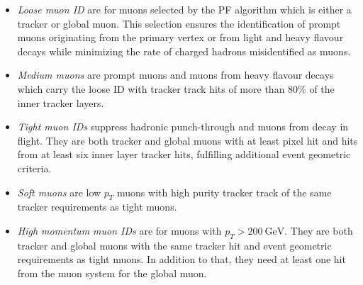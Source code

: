 \begin{itemize}
	\item[] \textit{Loose muon ID} are for muons selected by the PF algorithm which is either a tracker or global muon. This selection ensures the identification of prompt muons originating from the primary vertex or from light and heavy flavour decays while minimizing the rate of charged hadrons misidentified as muons.
	\item[] \textit{Medium muons} are prompt muons and muons from heavy flavour decays which carry the loose ID with tracker track hits of more than 80\% of the inner tracker layers.
	\item[] \textit{Tight muon IDs} suppress hadronic punch-through and muons from decay in flight. They are both tracker and global muons with at least pixel hit and hits from at least six inner layer tracker hits, fulfilling additional event geometric criteria.
	\item[] \textit{Soft muons} are low $p_T$ muons with high purity tracker track of the same tracker requirements as tight muons.
	\item[] \textit{High momentum muon IDs} are for muons with $p_T > \SI{200}{\giga\electronvolt}$. They are both tracker and global muons with the same tracker hit and event geometric requirements as tight muons. In addition to that, they need at least one hit from the muon system for the global muon.
\end{itemize}